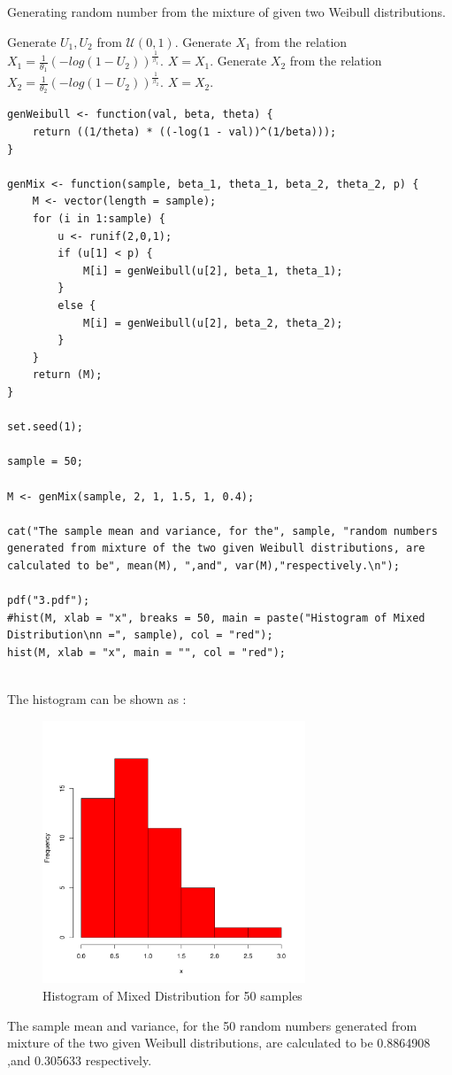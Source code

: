 \documentclass[11pt]{article}
\begin{document}
\begin{algorithm}[H]
\caption{Generating random number from the mixture of given two Weibull distributions.}
\begin{algorithmic}[1]
\STATE Generate $U_1, U_2$ from $\mathcal{U}(0,1)$.
	\STATE Generate $X_1$ from the relation $X_1 = \frac{1}{\theta_1}(-log(1-U_2))^{\frac{1}{\beta_1}}$.
	\STATE $X = X_1$.
\ELSE
	\STATE Generate $X_2$ from the relation $X_2 = \frac{1}{\theta_2}(-log(1-U_2))^{\frac{1}{\beta_2}}$.
	\STATE $X = X_2$.
\ENDIF
\end{algorithmic}
\end{algorithm}
\newpage
{}
\begin{lstlisting}
genWeibull <- function(val, beta, theta) {
	return ((1/theta) * ((-log(1 - val))^(1/beta)));
}

genMix <- function(sample, beta_1, theta_1, beta_2, theta_2, p) {
	M <- vector(length = sample);
	for (i in 1:sample) {
		u <- runif(2,0,1);
		if (u[1] < p) {
			M[i] = genWeibull(u[2], beta_1, theta_1);
		}
		else {
			M[i] = genWeibull(u[2], beta_2, theta_2);
		}
	}
	return (M);
}

set.seed(1);

sample = 50;

M <- genMix(sample, 2, 1, 1.5, 1, 0.4);

cat("The sample mean and variance, for the", sample, "random numbers generated from mixture of the two given Weibull distributions, are calculated to be", mean(M), ",and", var(M),"respectively.\n");

pdf("3.pdf");
#hist(M, xlab = "x", breaks = 50, main = paste("Histogram of Mixed Distribution\nn =", sample), col = "red");
hist(M, xlab = "x", main = "", col = "red");
\end{lstlisting}
\newpage
{}\\
The histogram can be shown as :
\begin{figure}[H]
	\centering
	\includegraphics[width=0.7\textwidth]{3.pdf}
		\caption{Histogram of Mixed Distribution for 50 samples}
\end{figure}

The sample mean and variance, for the 50 random numbers generated from mixture of the two given Weibull distributions, are calculated to be 0.8864908 ,and 0.305633 respectively.
\end{document}

